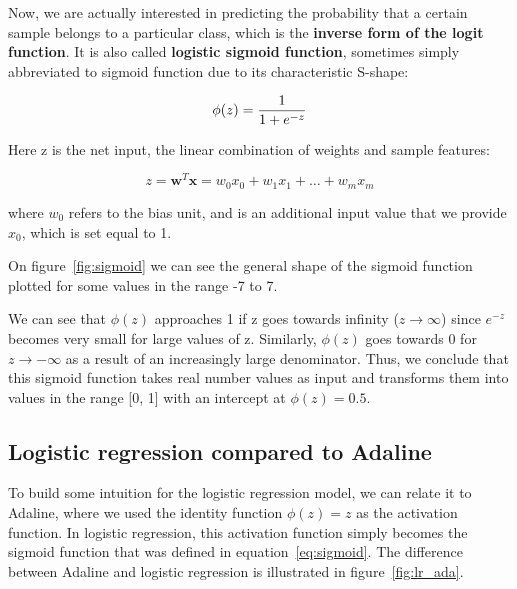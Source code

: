\documentclass[11pt]{article}
\newcommand{\vect}[1]{\boldsymbol{#1}}
\begin{document}
    Now, we are actually interested in predicting the probability that a certain sample belongs to a particular class, which is the \textbf{inverse form of the logit function}.
    It is also called \textbf{logistic sigmoid function}, sometimes simply abbreviated to sigmoid function due to its characteristic S-shape:

    \begin{equation}
        \label{eq:sigmoid}
        \large{ \phi(z) = \frac{1} {1 + e^{-z}} }
    \end{equation}

    Here z is the net input, the linear combination of weights and sample features:

    \begin{equation}
        \label{eq:net_input}
        z = \vect{w}^T \vect{x} = w_0 x_0 + w_1 x_1 + \dots + w_m x_m
    \end{equation}

    where $w_0$ refers to the bias unit, and is an additional input value that we provide $x_0$, which is set equal to 1.

    On figure~\ref{fig:sigmoid} we can see the general shape of the sigmoid function plotted for some values in the range -7 to 7.

    We can see that $\phi(z)$ approaches 1 if z goes towards infinity ($z \to \infty$) since $e^{-z}$ becomes very small for large values of z.
    Similarly, $\phi(z)$ goes towards 0 for $z \to -\infty$ as a result of an increasingly large denominator.
    Thus, we conclude that this sigmoid function takes real number values as input and transforms them into values in the range [0, 1] with an intercept at $\phi(z) = 0.5$.

    \subsection{Logistic regression compared to Adaline} \label{subsec:lr_ada}

    To build some intuition for the logistic regression model, we can relate it to Adaline, where we used the identity function $\phi(z) = z$ as the activation function.
    In logistic regression, this activation function simply becomes the sigmoid function that was defined in equation~\ref{eq:sigmoid}.
    The difference between Adaline and logistic regression is illustrated in figure~\ref{fig:lr_ada}.
\end{document}
